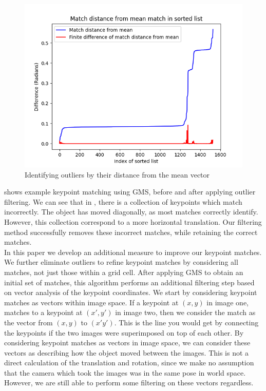 \begin{figure}[h]
    \centering
    \includegraphics[width=\textwidth]{figures/bad-matches.png}
    \caption{Identifying outliers by their distance from the mean vector}
    \label{fig:bad-matches}
\end{figure}

 shows example keypoint matching using GMS, before and after applying outlier filtering. We can see that in , there is a collection of keypoints which match incorrectly. The object has moved diagonally, as most matches correctly identify. However, this collection correspond to a more horizontal translation. Our filtering method successfully removes these incorrect matches, while retaining the correct matches.\\

In this paper we develop an additional measure to improve our keypoint matches. We further eliminate outliers to refine keypoint matches by considering all matches, not just those within a grid cell. After applying GMS to obtain an initial set of matches, this algorithm performs an additional filtering step based on vector analysis of the keypoint coordinates. We start by considering keypoint matches as vectors within image space. If a keypoint at $(x,y)$ in image one, matches to a keypoint at $(x',y')$ in image two, then we consider the match as the vector from $(x,y)$ to $(x'y')$. This is the line you would get by connecting the keypoints if the two images were superimposed on top of each other. By considering keypoint matches as vectors in image space, we can consider these vectors as describing how the object moved between the images. This is not a direct calculation of the translation and rotation, since we make no assumption that the camera which took the images was in the same pose in world space. However, we are still able to perform some filtering on these vectors regardless.\\

